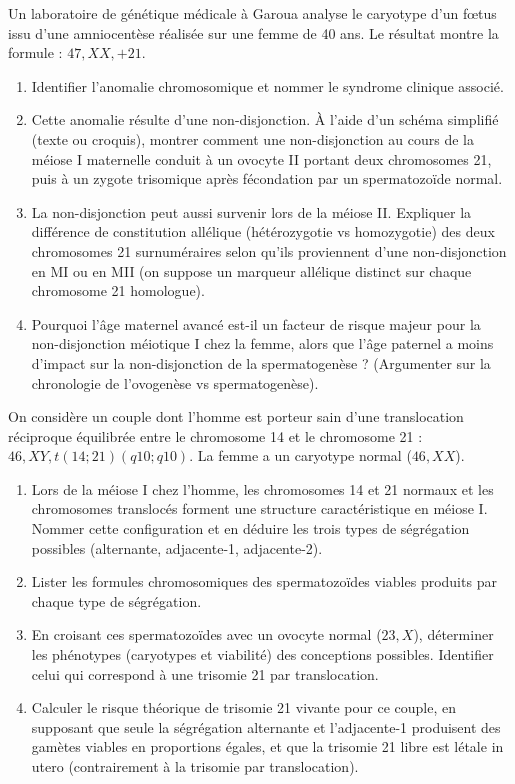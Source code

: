 \documentclass[11pt]{article}
\begin{document}
\begin{exercice}
Un laboratoire de génétique médicale à Garoua analyse le caryotype d'un fœtus issu d'une amniocentèse réalisée sur une femme de 40 ans. Le résultat montre la formule : $47,XX,+21$.
\begin{enumerate}
    \item Identifier l'anomalie chromosomique et nommer le syndrome clinique associé.
    \item Cette anomalie résulte d'une non-disjonction. À l'aide d'un schéma simplifié (texte ou croquis), montrer comment une non-disjonction au cours de la méiose I maternelle conduit à un ovocyte II portant deux chromosomes 21, puis à un zygote trisomique après fécondation par un spermatozoïde normal.
    \item La non-disjonction peut aussi survenir lors de la méiose II. Expliquer la différence de constitution allélique (hétérozygotie vs homozygotie) des deux chromosomes 21 surnuméraires selon qu'ils proviennent d'une non-disjonction en MI ou en MII (on suppose un marqueur allélique distinct sur chaque chromosome 21 homologue).
    \item Pourquoi l'âge maternel avancé est-il un facteur de risque majeur pour la non-disjonction méiotique I chez la femme, alors que l'âge paternel a moins d'impact sur la non-disjonction de la spermatogenèse ? (Argumenter sur la chronologie de l'ovogenèse vs spermatogenèse).
\end{enumerate}
\end{exercice}

\begin{exercice}
On considère un couple dont l'homme est porteur sain d'une translocation réciproque équilibrée entre le chromosome 14 et le chromosome 21 : $46,XY,t(14;21)(q10;q10)$. La femme a un caryotype normal ($46,XX$).
\begin{enumerate}
    \item Lors de la méiose I chez l'homme, les chromosomes 14 et 21 normaux et les chromosomes translocés forment une structure caractéristique en méiose I. Nommer cette configuration et en déduire les trois types de ségrégation possibles (alternante, adjacente-1, adjacente-2).
    \item Lister les formules chromosomiques des spermatozoïdes viables produits par chaque type de ségrégation.
    \item En croisant ces spermatozoïdes avec un ovocyte normal ($23,X$), déterminer les phénotypes (caryotypes et viabilité) des conceptions possibles. Identifier celui qui correspond à une trisomie 21 par translocation.
    \item Calculer le risque théorique de trisomie 21 vivante pour ce couple, en supposant que seule la ségrégation alternante et l'adjacente-1 produisent des gamètes viables en proportions égales, et que la trisomie 21 libre est létale in utero (contrairement à la trisomie par translocation).
\end{enumerate}
\end{exercice}
\end{document}
